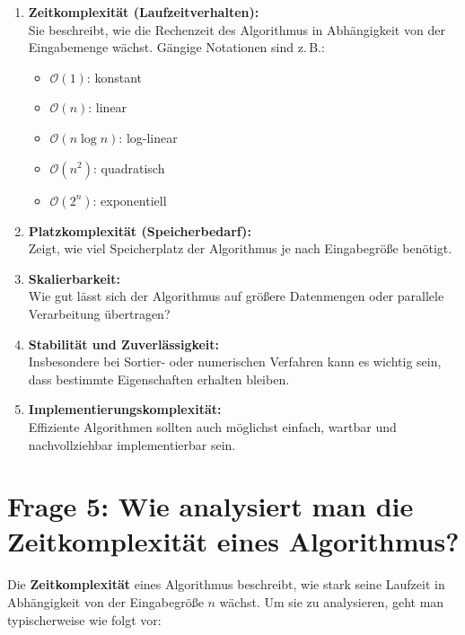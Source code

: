 \documentclass{article}
\begin{document}
\begin{enumerate}
	\item \textbf{Zeitkomplexität (Laufzeitverhalten):} \\
	Sie beschreibt, wie die Rechenzeit des Algorithmus in Abhängigkeit von der Eingabemenge wächst. Gängige Notationen sind z.\,B.:
	\begin{itemize}
		\item \( \mathcal{O}(1) \): konstant
		\item \( \mathcal{O}(n) \): linear
		\item \( \mathcal{O}(n \log n) \): log-linear
		\item \( \mathcal{O}(n^2) \): quadratisch
		\item \( \mathcal{O}(2^n) \): exponentiell
	\end{itemize}
	
	\item \textbf{Platzkomplexität (Speicherbedarf):} \\
	Zeigt, wie viel Speicherplatz der Algorithmus je nach Eingabegröße benötigt.
	
	\item \textbf{Skalierbarkeit:} \\
	Wie gut lässt sich der Algorithmus auf größere Datenmengen oder parallele Verarbeitung übertragen?
	
	\item \textbf{Stabilität und Zuverlässigkeit:} \\
	Insbesondere bei Sortier- oder numerischen Verfahren kann es wichtig sein, dass bestimmte Eigenschaften erhalten bleiben.
	
	\item \textbf{Implementierungskomplexität:} \\
	Effiziente Algorithmen sollten auch möglichst einfach, wartbar und nachvollziehbar implementierbar sein.
\end{enumerate}


\section*{Frage 5: Wie analysiert man die Zeitkomplexität eines Algorithmus?}

Die \textbf{Zeitkomplexität} eines Algorithmus beschreibt, wie stark seine Laufzeit in Abhängigkeit von der Eingabegröße \( n \) wächst. Um sie zu analysieren, geht man typischerweise wie folgt vor:
\end{document}
